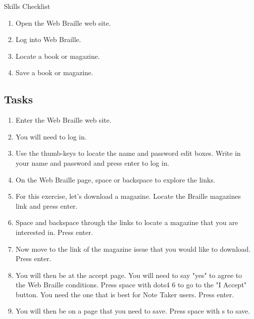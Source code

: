 \documentclass[10pt,letterpaper,twoside]{report}
\begin{document}
{{{{Skills Checklist



\begin{enumerate}
	\item Open the Web Braille web site.
	      
	\item Log into Web Braille.
	      
	\item Locate a book or magazine.
	      
	\item Save a book or magazine.
\end{enumerate}



 \subsection{Tasks}



\begin{enumerate}
	\item Enter the Web Braille web site.
	      
	\item You will need to log in.
	      
	\item Use the thumb-keys to locate the name and password edit boxes.  Write in your name and password and press enter to log in.
	      
	\item On the Web Braille page, space or backspace to explore the links.
	      
	\item For this exercise, let's download a magazine.  Locate the Braille magazines link and press enter.
	      
	\item Space and backspace through the links to locate a magazine that you are interested in.  Press enter.
	      
	\item Now move to the link of the magazine issue that you would like to download.  Press enter.
	      
	\item You will then be at the accept page.  You will need to say "yes" to agree to the Web Braille conditions.  Press space with dots4 6 to go to the "I Accept" button.  You need the one that is best for Note Taker users.  Press enter.
	      
	\item You will then be on a page that you need to save.  Press space with s to save.
	      

\end{enumerate}}}}}
\end{document}
